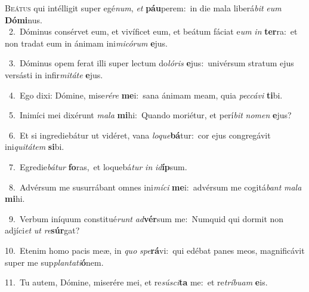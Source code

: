 \lettrine{\initial\textcolor{\initialcolor}{B}}{eátus} qui intélligit super egé\-\textit{num}\-, \textit{et} \textbf{páu}\-perem:~\star in die mala liberá\textit{bit} \textit{e}\-\textit{um} \textbf{Dó}\-\textbf{mi}nus.\\
{\numbfont\textcolor{\numbcolor}{~2.}}~Dóminus consérvet eum, et vivíficet eum, et beátum fáciat e\textit{um} \textit{in} \textbf{ter}\-ra:~\star et non tradat eum in ánimam ini\-\textit{mi}\-\textit{có}\textit{rum} \textbf{e}\-jus.\par
{\numbfont\textcolor{\numbcolor}{~3.}}~Dóminus opem ferat illi super lectum do\-\textit{ló}\-\textit{ris} \textbf{e}\-jus:~\star univérsum stratum ejus versásti in infir\-\textit{mi}\-\textit{tá}\textit{te} \textbf{e}\-jus.\par
{\numbfont\textcolor{\numbcolor}{~4.}}~Ego dixi: Dómine, mise\-\textit{ré}\-\textit{re} \textbf{me}\-i:~\star sana ánimam meam, quia \textit{pec}\-\textit{cá}\textit{vi} \textbf{ti}\-bi.\par
{\numbfont\textcolor{\numbcolor}{~5.}}~Inimíci mei dixérunt \textit{ma}\-\textit{la} \textbf{mi}\-hi:~\star Quando moriétur, et perí\textit{bit} \textit{no}\-\textit{men} \textbf{e}\-jus?\par
{\numbfont\textcolor{\numbcolor}{~6.}}~Et si ingrediebátur ut vidéret, vana \textit{lo}\-\textit{que}\textbf{bá}tur:~\star cor ejus congregávit ini\-\textit{qui}\-\textit{tá}\textit{tem} \textbf{si}\-bi.\par
{\numbfont\textcolor{\numbcolor}{~7.}}~Egredie\-\textit{bá}\-\textit{tur} \textbf{fo}\-ras,~\star et loquebá\textit{tur} \textit{in} \textit{id}\-\textbf{íp}sum.\par
{\numbfont\textcolor{\numbcolor}{~8.}}~Advérsum me susurrábant omnes ini\-\textit{mí}\-\textit{ci} \textbf{me}\-i:~\star advérsum me cogitá\textit{bant} \textit{ma}\-\textit{la} \textbf{mi}\-hi.\par
{\numbfont\textcolor{\numbcolor}{~9.}}~Verbum iníquum constitué\textit{runt} \textit{ad}\-\textbf{vér}sum me:~\star Numquid qui dormit non adjíci\textit{et} \textit{ut} \textit{re}\-\textbf{súr}gat?\par
{\numbfont\textcolor{\numbcolor}{10.}}~Etenim homo pacis meæ, in \textit{quo} \textit{spe}\-\textbf{rá}vi:~\star qui edébat panes meos, magnificávit super me sup\-\textit{plan}\-\textit{ta}\textit{ti}\textbf{ó}nem.\par
{\numbfont\textcolor{\numbcolor}{11.}}~Tu autem, Dómine, miserére mei, et re\-\textit{sú}\-\textit{sci}\textbf{ta} me:~\star et re\-\textit{trí}\-\textit{bu}\textit{am} \textbf{e}\-is.\par
